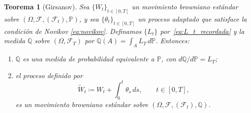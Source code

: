 \documentclass[11pt,a4paper,oneside]{report}
\theoremstyle{plain}
\newtheorem{teorema}{Teorema}[chapter]
\theoremstyle{definition}
\theoremstyle{remark}
\newcommand{\PP}{\mathbb{P}}
\newcommand{\Q}{\mathbb{Q}}
\newcommand{\F}{\mathcal{F}}
\newcommand{\1}{\mathbf{1}}
\newcommand{\eqdef}{\coloneqq}
\begin{document}
\begin{teorema}[Girsanov]
\label{teo:girsanov}
Sea $\{W_t\}_{t \in [0, T]}$ un movimiento browniano estándar sobre
$(\Omega, \F, (\F_t), \PP)$, y sea $\{\theta_t\}_{t \in [0, T]}$ un
proceso adaptado que satisface la condición de Novikov
\eqref{eq:novikov}. Definamos $\{L_t\}$ por~\eqref{eq:L_t_recordada} y
la medida $\Q$ sobre $(\Omega, \F_T)$ por
$\Q(A) = \int_A L_T\, d\PP$. Entonces:
\begin{enumerate}[label=\textnormal{(\roman*)}]
  \item $\Q$ es una medida de probabilidad equivalente a $\PP$, con
        $d\Q/d\PP = L_T$;
  \item el proceso definido por
        \begin{equation}\label{eq:def_W_tilde}
          \widetilde{W}_t \eqdef W_t + \int_0^t \theta_s\, ds,
          \qquad t \in [0, T],
        \end{equation}
        es un movimiento browniano estándar sobre $(\Omega, \F, (\F_t),
        \Q)$.
\end{enumerate}
\end{teorema}
\end{document}
